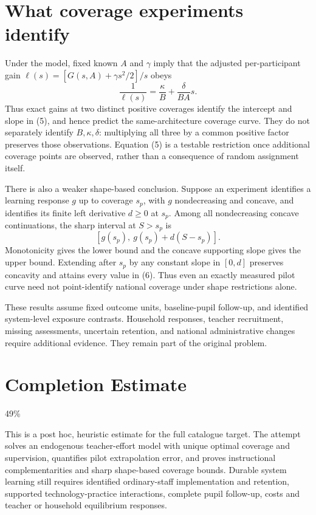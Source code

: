 \documentclass[11pt,a4paper]{article}
\theoremstyle{remark}
\begin{document}
\section{What coverage experiments identify}
Under the model, fixed known $A$ and $\gamma$ imply that the adjusted per-participant gain
$\ell(s)=[G(s,A)+\gamma s^2/2]/s$ obeys
\[
 \frac1{\ell(s)}=\frac\kappa B+\frac\delta{BA}s. \tag{5}
\]
Thus exact gains at two distinct positive coverages identify the intercept and slope in (5), and hence predict the same-architecture coverage curve. They do not separately identify $B,\kappa,\delta$: multiplying all three by a common positive factor preserves those observations. Equation (5) is a testable restriction once additional coverage points are observed, rather than a consequence of random assignment itself.

There is also a weaker shape-based conclusion. Suppose an experiment identifies a learning response $g$ up to coverage $s_p$, with $g$ nondecreasing and concave, and identifies its finite left derivative $d\ge0$ at $s_p$. Among all nondecreasing concave continuations, the sharp interval at $S>s_p$ is
\[
 [g(s_p),\ g(s_p)+d(S-s_p)]. \tag{6}
\]
Monotonicity gives the lower bound and the concave supporting slope gives the upper bound. Extending after $s_p$ by any constant slope in $[0,d]$ preserves concavity and attains every value in (6). Thus even an exactly measured pilot curve need not point-identify national coverage under shape restrictions alone.

These results assume fixed outcome units, baseline-pupil follow-up, and identified system-level exposure contrasts. Household responses, teacher recruitment, missing assessments, uncertain retention, and national administrative changes require additional evidence. They remain part of the original problem.

\section{Completion Estimate}
49\%

This is a post hoc, heuristic estimate for the full catalogue target.
The attempt solves an endogenous teacher-effort model with unique optimal coverage and supervision, quantifies pilot extrapolation error, and proves instructional complementarities and sharp shape-based coverage bounds. Durable system learning still requires identified ordinary-staff implementation and retention, supported technology-practice interactions, complete pupil follow-up, costs and teacher or household equilibrium responses.
\end{document}
